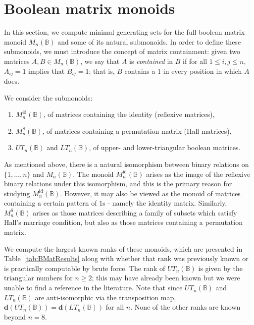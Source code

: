 \documentclass[11pt]{article}
\numberwithin{equation}{section}
\newcommand{\B}{\mathbb{B}}
\newcommand{\Bn}{M_n(\B)}
\newcommand{\Refln}{M_n^{\text{id}}(\B)}
\newcommand{\Halln}{M_n^{\text{S}}(\B)}
\newcommand{\UTn}{UT_n(\B)}
\newcommand{\LTn}{LT_n(\B)}
\begin{document}

\section{Boolean matrix monoids}
\label{sec:boolmat}

In this section, we compute minimal generating sets for the full boolean matrix
monoid $\Bn$ and some of its natural submonoids. In order to define these
submonoids, we must introduce the concept of matrix containment: given two
matrices $A, B \in \Bn$, we say that $A$ is \emph{contained} in $B$ if for all
$1 \leq i,j \leq n$, $A_{ij} = 1$ implies that $B_{ij} = 1$; that is, $B$ contains
a $1$ in every position in which $A$ does.

We consider the submonoids:
\begin{enumerate}[label={\rm (\roman*)}]
  \item $\Refln$, of matrices containing the identity (reflexive matrices),
  \item $\Halln$, of matrices containing a permutation matrix (Hall matrices),
  \item $\UTn$ and $\LTn$, of upper- and lower-triangular boolean matrices.
\end{enumerate}

As mentioned above, there is a natural isomorphism between binary relations on
$\{1, \ldots, n\}$ and $\Bn$.  The monoid $\Refln$ arises as the image of the
reflexive binary relations under this isomorphism, and this is the primary
reason for studying $\Refln$. However, it may also be viewed as the monoid of
matrices containing a certain pattern of $1$s - namely the identity matrix.
Similarly, $\Halln$ arises as those matrices describing a family of subsets
which satisfy Hall's marriage condition, but also as those matrices containing a
permutation matrix.

We compute the largest known ranks of these monoids, which are presented in
Table~\ref{tab:BMatResults} along with whether that rank was previously known or
is practically computable by brute force. The rank of $\UTn$ is given by the
triangular numbers for $n \geq 2$; this may have already been known but we
were unable to find a reference in the literature. Note that since $\UTn$ and
$\LTn$ are anti-isomorphic via the transposition map, $\mathbf{d}(\UTn) =
\mathbf{d}(\LTn)$ for all $n$. None of the other ranks are known beyond $n = 8$. 
\end{document}
